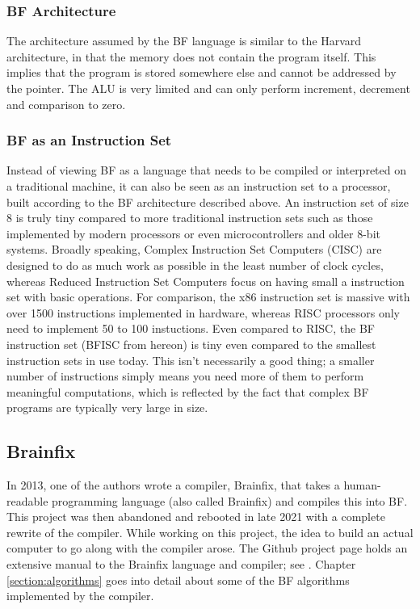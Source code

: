 \subsubsection{BF Architecture}
The architecture assumed by the BF language is similar to the Harvard architecture, in that the memory does not contain the program itself. This implies that the program is stored somewhere else and cannot be addressed by the pointer. The ALU is very limited and can only perform increment, decrement and comparison to zero.


\subsubsection{BF as an Instruction Set}
Instead of viewing BF as a language that needs to be compiled or interpreted on a traditional machine, it can also be seen as an instruction set to a processor, built according to the BF architecture described above. An instruction set of size 8 is truly tiny compared to more traditional instruction sets such as those implemented by modern processors or even microcontrollers and older 8-bit systems. Broadly speaking, Complex Instruction Set Computers (CISC) are designed to do as much work as possible in the least number of clock cycles, whereas Reduced Instruction Set Computers focus on having small a instruction set with basic operations. For comparison, the x86 instruction set is massive with over 1500 instructions implemented in hardware, whereas RISC processors only need to implement 50 to 100 instuctions. Even compared to RISC, the BF instruction set (BFISC from hereon) is tiny even compared to the smallest instruction sets in use today. This isn't necessarily a good thing; a smaller number of instructions simply means you need more of them to perform meaningful computations, which is reflected by the fact that complex BF programs are typically very large in size.

\subsection{Brainfix}
In 2013, one of the authors wrote a compiler, Brainfix, that takes a human-readable programming language (also called Brainfix) and compiles this into BF. This project was then abandoned and rebooted in late 2021 with a complete rewrite of the compiler. While working on this project, the idea to build an actual computer to go along with the compiler arose. The Github project page holds an extensive manual to the Brainfix language and compiler; see \cite{brainfix}. Chapter \ref{section:algorithms} goes into detail about some of the BF algorithms implemented by the compiler.
